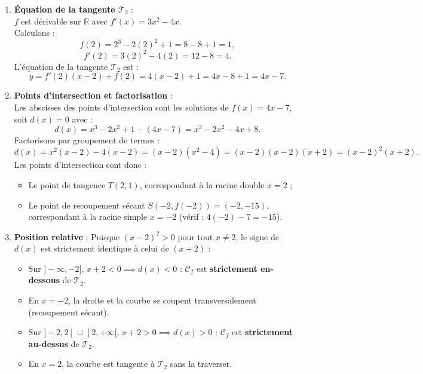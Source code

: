 \documentclass[11pt,a4paper]{article}
\newcommand{\R}{\mathbb{R}}
\begin{document}
\begin{correctionbox}
\begin{enumerate}[label=\textbf{\arabic*.}]
    \item \textbf{Équation de la tangente $\mathcal{T}_2$} :\\
    $f$ est dérivable sur $\R$ avec $f'(x) = 3x^2 - 4x$.\\
    Calculons :
    \[
    f(2) = 2^3 - 2(2)^2 + 1 = 8 - 8 + 1 = 1,
    \]
    \[
    f'(2) = 3(2)^2 - 4(2) = 12 - 8 = 4.
    \]
    L'équation de la tangente $\mathcal{T}_2$ est :
    \[
    y = f'(2)(x - 2) + f(2) = 4(x - 2) + 1 = 4x - 8 + 1 = 4x - 7.
    \]

    \item \textbf{Points d'intersection et factorisation} :\\
    Les abscisses des points d'intersection sont les solutions de $f(x) = 4x - 7$, soit $d(x) = 0$ avec :
    \[
    d(x) = x^3 - 2x^2 + 1 - (4x - 7) = x^3 - 2x^2 - 4x + 8.
    \]
    Factorisons par groupement de termes :
    \[
    d(x) = x^2(x - 2) - 4(x - 2) = (x - 2)(x^2 - 4) = (x - 2)(x - 2)(x + 2) = (x - 2)^2 (x + 2).
    \]
    Les points d'intersection sont donc :
    \begin{itemize}
        \item Le point de tangence $T(2, 1)$, correspondant à la racine double $x = 2$ ;
        \item Le point de recoupement sécant $S(-2, f(-2)) = (-2, -15)$, correspondant à la racine simple $x = -2$ (vérif : $4(-2) - 7 = -15$).
    \end{itemize}

    \item \textbf{Position relative} :
    Puisque $(x - 2)^2 > 0$ pour tout $x \neq 2$, le signe de $d(x)$ est strictement identique à celui de $(x + 2)$ :
    \begin{itemize}
        \item Sur $]-\infty, -2[$, $x + 2 < 0 \implies d(x) < 0$ : $\mathcal{C}_f$ est \textbf{strictement en-dessous} de $\mathcal{T}_2$.
        \item En $x = -2$, la droite et la courbe se coupent transversalement (recoupement sécant).
        \item Sur $]-2, 2[\, \cup\, ]2, +\infty[$, $x + 2 > 0 \implies d(x) > 0$ : $\mathcal{C}_f$ est \textbf{strictement au-dessus} de $\mathcal{T}_2$.
        \item En $x = 2$, la courbe est tangente à $\mathcal{T}_2$ sans la traverser.
    \end{itemize}
\end{enumerate}
\end{correctionbox}
\end{document}
